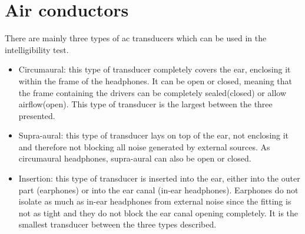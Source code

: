 \section{Air conductors}

There are mainly three types of \gls{ac} transducers which can be used in the intelligibility test.  %
\begin{itemize}
\item Circumaural: this type of transducer completely covers the ear, enclosing it within the frame of the headphones. It can be open or closed, meaning that the frame containing the drivers can be completely sealed(closed) or allow airflow(open). This type of transducer is the largest between the three presented.
\item Supra-aural:  this type of transducer lays on top of the ear, not enclosing it and therefore not blocking all noise generated by external sources. As circumaural headphones, supra-aural can also be open or closed.
\item Insertion: this type of transducer is inserted into the ear, either into the outer part (earphones) or into the ear canal (in-ear headphones). Earphones do not isolate as much as in-ear headphones from external noise since the fitting is not as tight and they do not block the ear canal opening completely. It is the smallest transducer between the three types described.
\end{itemize}
